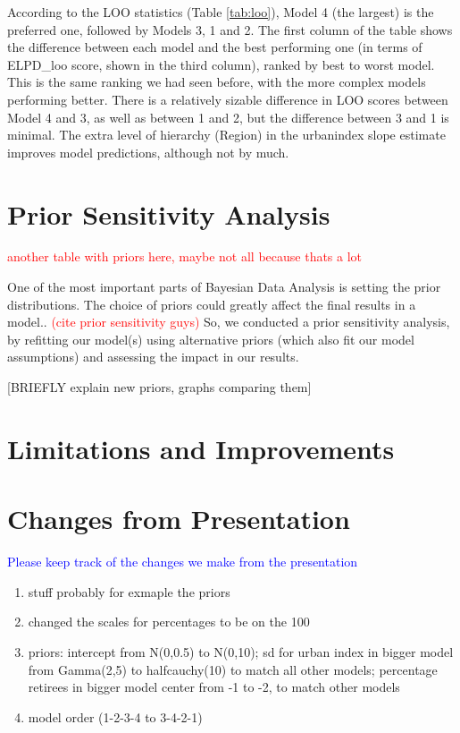 \documentclass[12pt]{article}
\newcommand{\blue}[1]{\textcolor{blue}{#1}}
\begin{document}
According to the LOO statistics (Table \ref{tab:loo}), Model 4 (the largest) is the preferred one, followed by Models 3, 1 and 2. The first column of the table shows the difference between each model and the best performing one (in terms of ELPD\_loo score, shown in the third column), ranked by best to worst model.
This is the same ranking we had seen before, with the more complex models performing better. There is a relatively sizable difference in LOO scores between Model 4 and 3, as well as between 1 and 2, but the difference between 3 and 1 is minimal. The extra level of hierarchy (Region) in the urbanindex slope estimate improves model predictions, although not by much.







\section{Prior Sensitivity Analysis}

\textcolor{red}{another table with priors here, maybe not all because thats a lot}

One of the most important parts of Bayesian Data Analysis is setting the prior distributions. The choice of priors could greatly affect the final results in a model..  \textcolor{red}{(cite prior sensitivity guys)}
So, we conducted a prior sensitivity analysis, by refitting our model(s) using alternative priors (which also fit our model assumptions) and assessing the impact in our results.

[BRIEFLY explain new priors, graphs comparing them]



\section{Limitations and Improvements}


\section{Changes from Presentation}
\blue{Please keep track of the changes we make from the presentation}
\begin{enumerate}
	\item stuff probably for exmaple the priors 
	\item changed the scales for percentages to be on the 100
	\item priors: intercept from N(0,0.5) to N(0,10); sd for urban index in bigger model from Gamma(2,5) to halfcauchy(10) to match all other models; percentage retirees in bigger model center from -1 to -2, to match other models
	\item model order (1-2-3-4 to 3-4-2-1) 
\end{enumerate}
\end{document}
